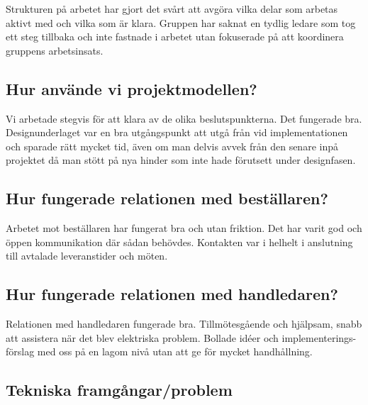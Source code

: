 \documentclass[10pt,oneside,swedish]{lips}
\begin{document}
\noindent
Strukturen på arbetet har gjort det svårt att avgöra vilka delar som arbetas aktivt med och vilka som är klara. Gruppen har saknat en tydlig ledare som tog ett steg tillbaka och inte fastnade i arbetet utan fokuserade på att koordinera gruppens arbetsinsats.


\subsection{Hur använde vi projektmodellen?}
Vi arbetade stegvis för att klara av de olika beslutspunkterna. Det fungerade bra. Designunderlaget var en bra utgångspunkt att utgå från vid implementationen och sparade rätt mycket tid, även om man delvis avvek från den senare inpå projektet då man stött på nya hinder som inte hade förutsett under designfasen.

\subsection{Hur fungerade relationen med beställaren?}
Arbetet mot beställaren har fungerat bra och utan friktion. Det har varit god och öppen kommunikation där sådan behövdes. Kontakten var i helhelt i anslutning till avtalade leveranstider och möten.

\subsection{Hur fungerade relationen med handledaren?}
Relationen med handledaren fungerade bra. Tillmötesgående och hjälpsam, snabb att assistera när det blev elektriska problem. Bollade idéer och implementerings-förslag med oss på en lagom nivå utan att ge för mycket handhållning.

\subsection{Tekniska framgångar/problem}
\end{document}
